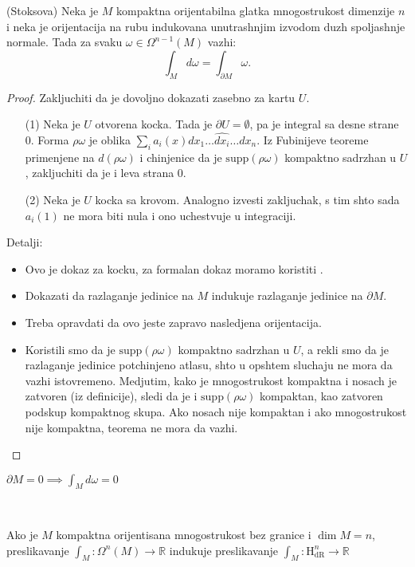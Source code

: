 \documentclass[a4paper,12pt]{article}
\newcommand{\latin}{\fontencoding{T1}\selectfont}
\newcommand{\RR}{\mathbb{R}}
\newcommand{\hdr}[1]{\mathrm{H}_\mathrm{dR}^{#1}}
\begin{document}
\begin{tma}(Stoksova)
	Neka je $M$ kompaktna orijentabilna glatka mnogostrukost dimenzije $n$ i neka je orijentacija na rubu indukovana unutrashnjim
	izvodom duzh spoljashnje normale. Tada za svaku $\omega \in \Omega^{n-1} (M)$ vazhi:
	\[ \int_M d\omega = \int_{\partial M} \omega .\] 
\end{tma}
\begin{proof}
	Zakljuchiti da je dovoljno dokazati zasebno za kartu $U$.
	\begin{enumerate}
		\item[(1)] Neka je $U$ otvorena kocka. Tada je $\partial U = \emptyset$, pa je integral sa desne strane 0.
			Forma $\rho \omega$ je oblika $\sum_i a_i(x) dx_1 \dotso \widehat{dx_i} \dotso dx_n$. Iz Fubinijeve teoreme primenjene na 
			$d(\rho \omega)$ i chinjenice da je $\mathrm{supp} (\rho \omega)$ kompaktno sadrzhan u $U$, zakljuchiti da je i leva strana 0.
		\item[(2)] Neka je $U$ kocka sa krovom. Analogno izvesti zakljuchak, s tim shto sada $a_i(1)$ ne mora biti nula i 
			ono uchestvuje u integraciji.
	\end{enumerate}

	Detalji:
	\begin{itemize}
		\item Ovo je dokaz za kocku, za formalan dokaz moramo koristiti {\latin{pullback}}.
		\item Dokazati da razlaganje jedinice na $M$ indukuje razlaganje jedinice na $\partial M$.
		\item Treba opravdati da ovo jeste zapravo nasledjena orijentacija.
		\item Koristili smo da je $\mathrm{supp}(\rho \omega)$ kompaktno sadrzhan u $U$, a rekli smo da je razlaganje jedinice
			potchinjeno atlasu, shto u opshtem sluchaju ne mora da vazhi istovremeno. Medjutim, kako je mnogostrukost kompaktna
			i nosach je zatvoren (iz definicije), sledi da je i $\mathrm{supp}(\rho \omega)$ kompaktan, kao zatvoren podskup
			kompaktnog skupa. Ako nosach nije kompaktan i ako mnogostrukost nije kompaktna, teorema ne mora da vazhi.
	\end{itemize}
\end{proof}

\begin{posl}
	\( \partial M = 0 \implies \int_M d\omega = 0 \) 
\end{posl}\\

\begin{posl}
	Ako je $M$ kompaktna orijentisana mnogostrukost bez granice i $\dim M = n$, preslikavanje \( \int_M:\Omega^n(M) \to \RR \) 
	indukuje preslikavanje \( \int_M:\hdr{n} \to \RR \) 
\end{posl}\\
\end{document}
